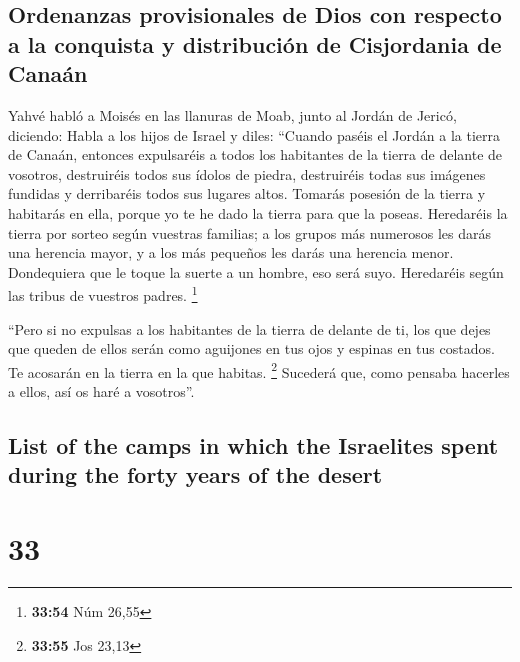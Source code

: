 \begin{paracol}{2}
\hypertarget{ordenanzas-provisionales-de-dios-con-respecto-a-la-conquista-y-distribuciuxf3n-de-cisjordania-de-canauxe1n}{%
\subsection{Ordenanzas provisionales de Dios con respecto a la conquista
y distribución de Cisjordania de
Canaán}\label{ordenanzas-provisionales-de-dios-con-respecto-a-la-conquista-y-distribuciuxf3n-de-cisjordania-de-canauxe1n}}

 Yahvé habló a Moisés en las llanuras de Moab, junto al
Jordán de Jericó, diciendo:  Habla a los hijos de Israel
y diles: ``Cuando paséis el Jordán a la tierra de Canaán,
 entonces expulsaréis a todos los habitantes de la tierra
de delante de vosotros, destruiréis todos sus ídolos de piedra,
destruiréis todas sus imágenes fundidas y derribaréis todos sus lugares
altos.  Tomarás posesión de la tierra y habitarás en
ella, porque yo te he dado la tierra para que la poseas. 
Heredaréis la tierra por sorteo según vuestras familias; a los grupos
más numerosos les darás una herencia mayor, y a los más pequeños les
darás una herencia menor. Dondequiera que le toque la suerte a un
hombre, eso será suyo. Heredaréis según las tribus de vuestros padres.
\footnote{\textbf{33:54} Núm 26,55}

 ``Pero si no expulsas a los habitantes de la tierra de
delante de ti, los que dejes que queden de ellos serán como aguijones en
tus ojos y espinas en tus costados. Te acosarán en la tierra en la que
habitas. \footnote{\textbf{33:55} Jos 23,13}  Sucederá
que, como pensaba hacerles a ellos, así os haré a vosotros''.

\switchcolumn
\begin{otherlanguage}{english}

\hypertarget{list-of-the-camps-in-which-the-israelites-spent-during-the-forty-years-of-the-desert}{%
\subsection{List of the camps in which the Israelites spent during the
forty years of the
desert}\label{list-of-the-camps-in-which-the-israelites-spent-during-the-forty-years-of-the-desert}}

\hypertarget{section-65}{%
\section{33}\label{section-65}}


\end{otherlanguage}
\end{paracol}

